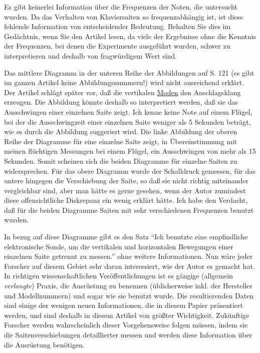 Es gibt keinerlei Information über die Frequenzen der Noten, die untersucht wurden.
Da das Verhalten von Klaviersaiten so frequenzabhängig ist, ist diese fehlende Information von entscheidender Bedeutung.
Behalten Sie dies im Gedächtnis, wenn Sie den Artikel lesen, da viele der Ergebnisse ohne die Kenntnis der Frequenzen, bei denen die Experimente ausgeführt wurden, schwer zu interpretieren und deshalb von fragwürdigem Wert sind.

Das mittlere Diagramm in der unteren Reihe der Abbildungen auf S. 121 (es gibt im ganzen Artikel keine Abbildungsnummern!) wird nicht ausreichend erklärt.
Der Artikel schlägt später vor, daß die vertikalen \hyperref[moden]{Moden} den Anschlagsklang erzeugen.
Die Abbildung könnte deshalb so interpretiert werden, daß sie das Ausschwingen einer einzelnen Saite zeigt.
Ich kenne keine Note auf einem Flügel, bei der die Ausschwingzeit einer einzelnen Saite weniger als 5 Sekunden beträgt, wie es durch die Abbildung suggeriert wird.
Die linke Abbildung der oberen Reihe der Diagramme für eine einzelne Saite zeigt, in Übereinstimmung mit meinen flüchtigen Messungen bei einem Flügel, ein Ausschwingen von mehr als 15 Sekunden.
Somit scheinen sich die beiden Diagramme für einzelne Saiten zu widersprechen.
Für das obere Diagramm wurde der Schalldruck gemessen, für das untere hingegen die Verschiebung der Saite, so daß sie nicht richtig miteinander vergleichbar sind, aber man hätte es gerne gesehen, wenn der Autor zumindest diese offensichtliche Diskrepanz ein wenig erklärt hätte.
Ich habe den Verdacht, daß für die beiden Diagramme Saiten mit sehr verschiedenen Frequenzen benutzt wurden.

In bezug auf diese Diagramme gibt es den Satz \enquote{Ich benutzte eine empfindliche elektronische Sonde, um die vertikalen und horizontalen Bewegungen einer einzelnen Saite getrennt zu messen.} ohne weitere Informationen.
Nun wäre jeder Forscher auf diesem Gebiet sehr daran interessiert, wie der Autor es gemacht hat.
In richtigen wissenschaftlichen Veröffentlichungen ist es gängige (allgemein \textit{verlangte}) Praxis, die Ausrüstung zu benennen (üblicherweise inkl. der Hersteller und Modellnummern) und sogar wie sie benutzt wurde.
Die resultierenden Daten sind einige der wenigen neuen Informationen, die in diesem Papier präsentiert werden, und sind deshalb in diesem Artikel von größter Wichtigkeit.
Zukünftige Forscher werden wahrscheinlich dieser Vorgehensweise folgen müssen, indem sie die Saitenverschiebungen detaillierter messen und werden diese Information über die Ausrüstung benötigen.

